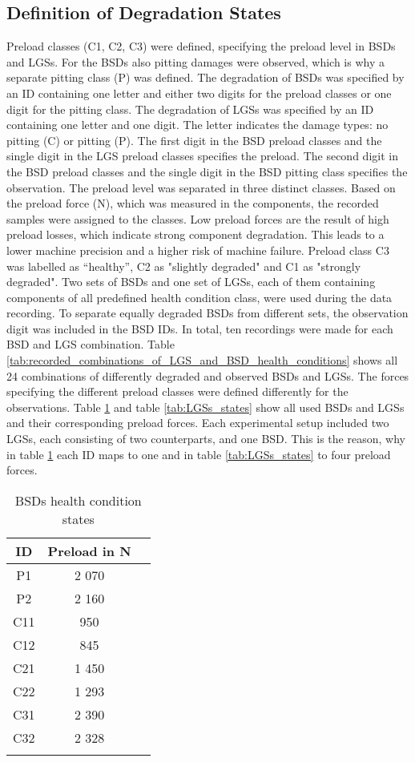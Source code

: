 \subsection{Definition of Degradation States}
Preload classes (C1, C2, C3) were defined, specifying the preload level in BSDs and LGSs. For the BSDs also pitting damages were observed, which is why a separate pitting class (P) was defined. The degradation of BSDs was specified by an ID containing one letter and either two digits for the preload classes or one digit for the pitting class. The degradation of LGSs was specified by an ID containing one letter and one digit. The letter indicates the damage types: no pitting (C) or pitting (P). The first digit in the BSD preload classes and the single digit in the LGS preload classes specifies the preload. The second digit in the BSD preload classes and the single digit in the BSD pitting class specifies the observation. The preload level was separated in three distinct classes. Based on the preload force (N), which was measured in the components, the recorded samples were assigned to the classes. Low preload forces are the result of high preload losses, which indicate strong component degradation. This leads to a lower machine precision and a higher risk of machine failure. Preload class C3 was labelled as “healthy”, C2 as "slightly degraded" and C1 as "strongly degraded". Two sets of BSDs and one set of LGSs, each of them containing components of all predefined health condition class, were used during the data recording. To separate equally degraded BSDs from different sets, the observation digit was included in the BSD IDs. In total, ten recordings were made for each BSD and LGS combination. Table \ref{tab:recorded_combinations_of_LGS_and_BSD_health_conditions} shows all 24 combinations of differently degraded and observed BSDs and LGSs. The forces specifying the different preload classes were defined differently for the observations. Table \ref {tab:BSDs_states} and table \ref {tab:LGSs_states} show all used BSDs and LGSs and their corresponding preload forces. Each experimental setup included two LGSs, each consisting of two counterparts, and one BSD. This is the reason, why in table \ref {tab:BSDs_states} each ID maps to one and in table \ref {tab:LGSs_states} to four preload forces.



\begin{center}
\begin{longtable}{c c c} 
\toprule
 ID & Preload in N \\ [0.5ex] 
\midrule
 P1 & 2 070 \\ 
 P2 & 2 160 \\ 
 C11 & 950 \\ 
 C12 & 845 \\ 
 C21 & 1 450 \\ [1ex] 
 C22 & 1 293 \\ [1ex] 
 C31 & 2 390 \\ [1ex] 
 C32 & 2 328 \\ [1ex] 
\bottomrule
\caption {BSDs health condition states}
\label {tab:BSDs_states}
\end{longtable}
\end{center}

